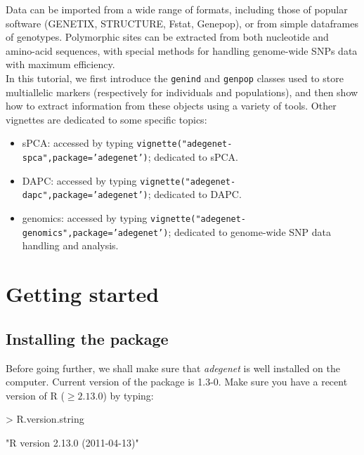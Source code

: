\documentclass{article}
\begin{document}
Data can be imported from a wide range of formats, including those of
popular software (GENETIX, STRUCTURE, Fstat, Genepop), or from simple dataframes of genotypes.
Polymorphic sites can be extracted from both nucleotide and amino-acid sequences, with special
methods for handling genome-wide SNPs data with maximum efficiency.
\\

In this tutorial, we first introduce the \texttt{genind} and \texttt{genpop} classes used to store
multiallelic markers (respectively for individuals and populations), and then show how to extract
information from these objects using a variety of tools.  Other vignettes are dedicated to some
specific topics:
\begin{itemize}
\item sPCA: accessed by typing \texttt{vignette("adegenet-spca",package='adegenet')}; dedicated to sPCA.
\item DAPC: accessed by typing \texttt{vignette("adegenet-dapc",package='adegenet')}; dedicated to DAPC.
\item genomics: accessed by typing \texttt{vignette("adegenet-genomics",package='adegenet')};
  dedicated to genome-wide SNP data handling and analysis.
\end{itemize}




\newpage
\section{Getting started}


\subsection{Installing the package}
Before going further, we shall make sure that \textit{adegenet} is well installed
on the computer.
Current version of the package is 1.3-0.
Make sure you have a recent version of R ($\geq 2.13.0$) by typing:
\begin{Schunk}
\begin{Sinput}
> R.version.string
\end{Sinput}
\begin{Soutput}
[1] "R version 2.13.0 (2011-04-13)"
\end{Soutput}
\end{Schunk}
\end{document}
